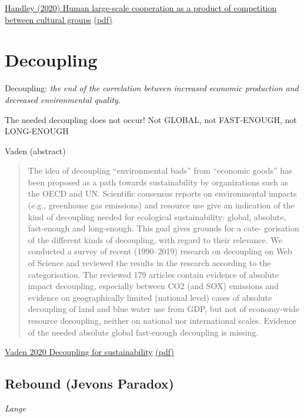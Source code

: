 \documentclass[
]{book}
\begin{document}
\href{https://www.nature.com/articles/s41467-020-14416-8}{Handley (2020) Human large-scale cooperation as a product of competition between cultural groups}
\href{pdf/Handley_2020_Cooperation.pdf}{(pdf)}

\hypertarget{decoupling}{%
\chapter{Decoupling}\label{decoupling}}

Decoupling: \emph{the end of the correlation between increased economic production and
decreased environmental quality.}

The needed decoupling does not occur!
Not GLOBAL, not FAST-ENOUGH, not LONG-ENOUGH

Vaden (abstract)

\begin{quote}
The idea of decoupling ``environmental bads'' from ``economic goods'' has been proposed as a path towards
sustainability by organizations such as the OECD and UN. Scientific consensus reports on environmental impacts
(e.g., greenhouse gas emissions) and resource use give an indication of the kind of decoupling needed for
ecological sustainability: global, absolute, fast-enough and long-enough. This goal gives grounds for a cate-
gorisation of the different kinds of decoupling, with regard to their relevance. We conducted a survey of recent
(1990--2019) research on decoupling on Web of Science and reviewed the results in the research according to the
categorisation. The reviewed 179 articles contain evidence of absolute impact decoupling, especially between
CO2 (and SOX) emissions and evidence on geographically limited (national level) cases of absolute decoupling of
land and blue water use from GDP, but not of economy-wide resource decoupling, neither on national nor
international scales. Evidence of the needed absolute global fast-enough decoupling is missing.
\end{quote}

\href{https://www.sciencedirect.com/science/article/pii/S1462901120304342}{Vaden 2020 Decoupling for sustainability}
\href{/pdf/Vaden_2020_Decoupling_Review.pdf}{(pdf)}

\hypertarget{rebound-jevons-paradox}{%
\section{Rebound (Jevons Paradox)}\label{rebound-jevons-paradox}}

\emph{Lange}
\end{document}
